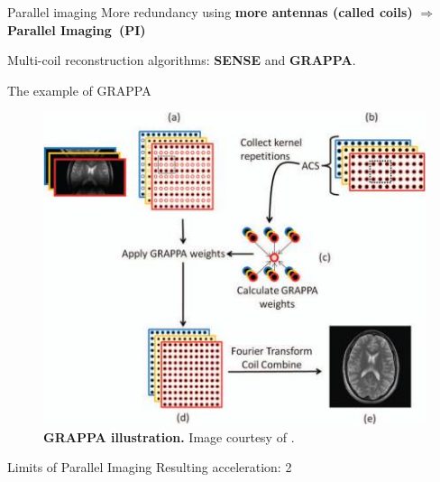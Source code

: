 \begin{frame}{Parallel imaging}
    More redundancy using \textbf{more antennas (called coils)} $\Rightarrow$ \textbf{Parallel Imaging~(PI)}
     
    Multi-coil reconstruction algorithms: \textbf{SENSE} and \textbf{GRAPPA}.
\end{frame}

\begin{frame}{The example of GRAPPA}
    \begin{figure}
        \centering
        \includegraphics[height=0.6\textheight]{Figures/intro_figures/GRAPPA.jpeg}
        \caption{\label{fig:GRAPPA}\textbf{GRAPPA illustration.} Image courtesy of \citet{deshmane2012parallel}.
        }
    \end{figure} 
\end{frame}

\begin{frame}{Limits of Parallel Imaging}
    Resulting acceleration: 2
\end{frame}